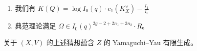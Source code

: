 \begin{conj}\leavevmode
    \begin{enumerate}
        \item 我们有 \(K(Q) = \log I_0(q) \cdot c_1(K_X^{\vee}) - \frac{I_1}{I_0}\) \\
        \item 典范理论满足 \(\Omega \in I_0(q)^{2g-2+2n_1 + 3 n_2} \cdot R\)。
    \end{enumerate}
\end{conj}

\begin{cor}
    关于 \((X, V)\) 的上述猜想蕴含 \(Z\) 的 Yamaguchi–Yau 有限生成。
\end{cor}

